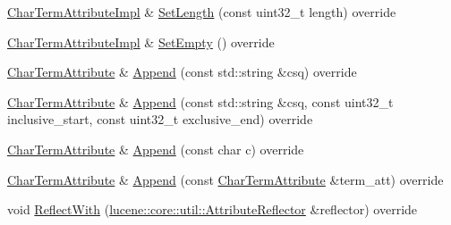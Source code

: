 \begin{DoxyCompactItemize}
\item 
\mbox{\hyperlink{classlucene_1_1core_1_1analysis_1_1tokenattributes_1_1CharTermAttributeImpl}{Char\+Term\+Attribute\+Impl}} \& \mbox{\hyperlink{classlucene_1_1core_1_1analysis_1_1tokenattributes_1_1CharTermAttributeImpl_a752c93bfaa290094349858306468c9a9}{Set\+Length}} (const uint32\+\_\+t length) override
\item 
\mbox{\hyperlink{classlucene_1_1core_1_1analysis_1_1tokenattributes_1_1CharTermAttributeImpl}{Char\+Term\+Attribute\+Impl}} \& \mbox{\hyperlink{classlucene_1_1core_1_1analysis_1_1tokenattributes_1_1CharTermAttributeImpl_a328d66d5bfd40a9bcd91ffe59933bc15}{Set\+Empty}} () override
\item 
\mbox{\hyperlink{classlucene_1_1core_1_1analysis_1_1tokenattributes_1_1CharTermAttribute}{Char\+Term\+Attribute}} \& \mbox{\hyperlink{classlucene_1_1core_1_1analysis_1_1tokenattributes_1_1CharTermAttributeImpl_aaf6bf26fa572599e284845f67b444900}{Append}} (const std\+::string \&csq) override
\item 
\mbox{\hyperlink{classlucene_1_1core_1_1analysis_1_1tokenattributes_1_1CharTermAttribute}{Char\+Term\+Attribute}} \& \mbox{\hyperlink{classlucene_1_1core_1_1analysis_1_1tokenattributes_1_1CharTermAttributeImpl_a5d2f89510d37dc11bbf22a77ac6bff83}{Append}} (const std\+::string \&csq, const uint32\+\_\+t inclusive\+\_\+start, const uint32\+\_\+t exclusive\+\_\+end) override
\item 
\mbox{\hyperlink{classlucene_1_1core_1_1analysis_1_1tokenattributes_1_1CharTermAttribute}{Char\+Term\+Attribute}} \& \mbox{\hyperlink{classlucene_1_1core_1_1analysis_1_1tokenattributes_1_1CharTermAttributeImpl_a1f8dccf1ecc42396f7f97b6a1972325f}{Append}} (const char c) override
\item 
\mbox{\hyperlink{classlucene_1_1core_1_1analysis_1_1tokenattributes_1_1CharTermAttribute}{Char\+Term\+Attribute}} \& \mbox{\hyperlink{classlucene_1_1core_1_1analysis_1_1tokenattributes_1_1CharTermAttributeImpl_ab8c8f791a3a504d86b3578a6f43810d1}{Append}} (const \mbox{\hyperlink{classlucene_1_1core_1_1analysis_1_1tokenattributes_1_1CharTermAttribute}{Char\+Term\+Attribute}} \&term\+\_\+att) override
\item 
void \mbox{\hyperlink{classlucene_1_1core_1_1analysis_1_1tokenattributes_1_1CharTermAttributeImpl_ae434068c40b8eab62af50e0e33a71bf4}{Reflect\+With}} (\mbox{\hyperlink{namespacelucene_1_1core_1_1util_a7dbb701adaed055f73fb95eec83da10a}{lucene\+::core\+::util\+::\+Attribute\+Reflector}} \&reflector) override
\item 

\end{DoxyCompactItemize}
